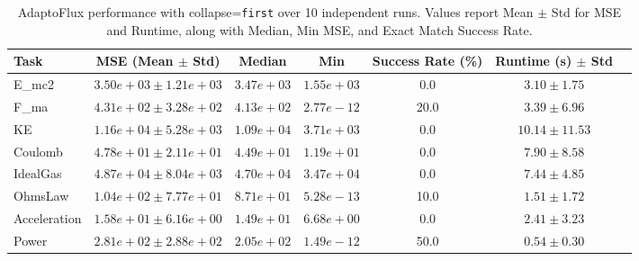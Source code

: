 \begin{table}[htbp]
    \centering
    \small %
    \setlength{\tabcolsep}{3pt} %
    \caption{AdaptoFlux performance with collapse=\texttt{first} over 10 independent runs. Values report Mean $\pm$ Std for MSE and Runtime, along with Median, Min MSE, and Exact Match Success Rate.}
    \label{tab:atf_stats_first}
    \begin{tabular}{lcccccc}
        \toprule
        Task & MSE (Mean $\pm$ Std) & Median & Min & Success Rate (\%) & Runtime (s) $\pm$ Std \\
        \midrule
        E\_mc2       & $3.50e+03 \pm 1.21e+03$ & $3.47e+03$ & $1.55e+03$ & 0.0  & $3.10 \pm 1.75$ \\
        F\_ma        & $4.31e+02 \pm 3.28e+02$ & $4.13e+02$ & $2.77e-12$ & 20.0 & $3.39 \pm 6.96$ \\
        KE           & $1.16e+04 \pm 5.28e+03$ & $1.09e+04$ & $3.71e+03$ & 0.0  & $10.14 \pm 11.53$ \\
        Coulomb      & $4.78e+01 \pm 2.11e+01$ & $4.49e+01$ & $1.19e+01$ & 0.0  & $7.90 \pm 8.58$ \\
        IdealGas     & $4.87e+04 \pm 8.04e+03$ & $4.70e+04$ & $3.47e+04$ & 0.0  & $7.44 \pm 4.85$ \\
        OhmsLaw      & $1.04e+02 \pm 7.77e+01$ & $8.71e+01$ & $5.28e-13$ & 10.0 & $1.51 \pm 1.72$ \\
        Acceleration & $1.58e+01 \pm 6.16e+00$ & $1.49e+01$ & $6.68e+00$ & 0.0  & $2.41 \pm 3.23$ \\
        Power        & $2.81e+02 \pm 2.88e+02$ & $2.05e+02$ & $1.49e-12$ & 50.0 & $0.54 \pm 0.30$ \\
        \bottomrule
    \end{tabular}
\end{table}

